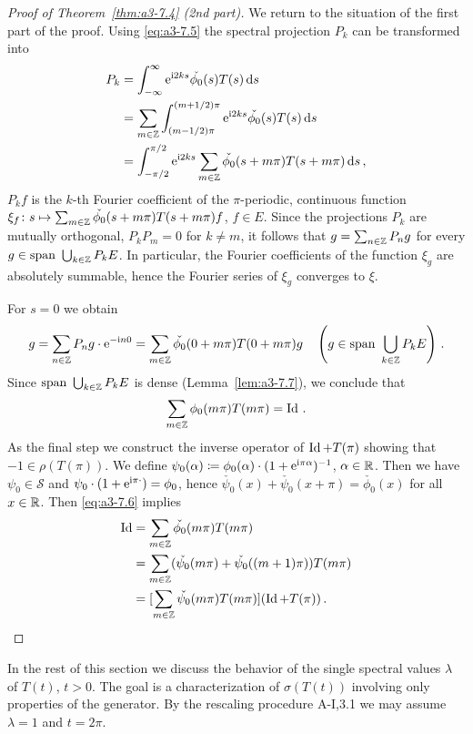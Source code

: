 \begin{proof}[Proof of Theorem~\ref{thm:a3-7.4} (2nd part)]
We return to the situation of the first part of the proof.
Using \eqref{eq:a3-7.5} the spectral projection $P_{k}$ can be transformed into
\begin{align*}
P_{k} &= \int_{-\infty}^{\infty} \mathrm{e}^{\mathrm{i} 2ks}\check{\phi_{0}}(s)T(s)\mathop{}\!\mathrm{d}{s} \\
&= \sum_{m\in\mathbb{Z}} \int_{(m-1/2)\pi}^{(m+1/2)\pi} \mathrm{e}^{\mathrm{i} 2ks}\check{\phi_{0}}(s)T(s)\mathop{}\!\mathrm{d}{s} \\
&= \int_{-\pi/2}^{\pi/2} \mathrm{e}^{\mathrm{i} 2ks}\sum_{m\in\mathbb{Z}}\check{\phi_{0}}(s+m\pi)T(s+m\pi)\mathop{}\!\mathrm{d}{s}\,,
\end{align*}
\ie $P_{k}f$ is the $k$-th Fourier coefficient of the $\pi$-periodic, continuous function $\xi_{f} \colon s \mapsto \sum_{m\in\mathbb{Z}} \check{\phi_{0}}(s+m\pi)T(s+m\pi)f$, $f \in E$.
Since the projections $P_{k}$ are mutually orthogonal, \ie $P_{k}P_{m} = 0$ for $k \neq m$, it follows that $g = \sum_{n\in\mathbb{Z}} P_{n}g$ for every $g \in \text{span }\bigcup_{k\in\mathbb{Z}} P_{k}E$.
In particular, the Fourier coefficients of the function $\xi_{g}$ are absolutely summable, hence the Fourier series of $\xi_{g}$ converges to $\xi$.

For $s = 0$ we obtain
\[
g = \sum_{n\in\mathbb{Z}} P_{n}g\cdot \mathrm{e}^{-\mathrm{i} n0} = \sum_{m\in\mathbb{Z}} \check{\phi_{0}}(0 + m\pi)T(0 + m\pi)g \quad 
\left(g \in \text{span }\bigcup_{k\in\mathbb{Z}} P_{k}E\right)\,.
\]
Since $\text{span }\bigcup_{k\in\mathbb{Z}} P_{k}E$ is dense (Lemma~\ref{lem:a3-7.7}), we conclude that
\begin{equation}\label{eq:a3-7.6}
\sum_{m\in\mathbb{Z}} \phi_{0}(m\pi)T(m\pi) = \operatorname{Id}\,.
\end{equation}
As the final step we construct the inverse operator of $\operatorname{Id} + T(\pi)$ showing that $-1 \in \rho(T(\pi))$.
We define $\psi_{0}(\alpha) \coloneqq \phi_{0}(\alpha)\cdot(1 + \mathrm{e}^{\mathrm{i}\pi\alpha})^{-1}$, $\alpha \in \mathbb{R}$.
Then we have $\psi_{0} \in \mathcal{S}$ and $\psi_{0}\cdot(1 + \mathrm{e}^{\mathrm{i}\pi\cdot}) = \phi_{0}$,
hence $\check{\psi_{0}}(x) + \check{\psi_{0}}(x + \pi) = \check{\phi_{0}}(x)$ for all $x \in \mathbb{R}$.
Then \eqref{eq:a3-7.6} implies
\begin{align*}
\operatorname{Id} &= \sum_{m\in\mathbb{Z}} \check{\phi_{0}}(m\pi)T(m\pi) \\
&= \sum_{m\in\mathbb{Z}} (\check{\psi_{0}}(m\pi) + \check{\psi_{0}}((m+1)\pi))T(m\pi) \\
&= [\sum_{m\in\mathbb{Z}} \check{\psi_{0}}(m\pi)T(m\pi)](\operatorname{Id} + T(\pi))\,.
\end{align*}
\end{proof}
In the rest of this section we discuss the behavior of the single spectral values $\lambda$ of $T(t)$, $t > 0$.
The goal is a characterization of $\sigma(T(t))$ involving only properties of the generator.
By the rescaling procedure A-I,3.1 we may assume $\lambda = 1$ and $t = 2\pi$.

